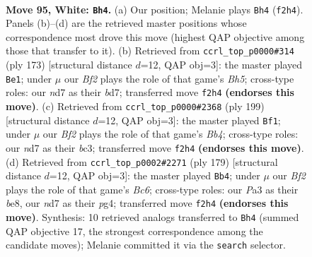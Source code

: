 \documentclass[11pt]{article}
\begin{document}
\clearpage

\begin{figure}[p]\centering
\begin{subfigure}{0.46\textwidth}\centering
\resizebox{\linewidth}{!}{%
\newchessgame
\chessboard[
  setfen={7k/3n4/8/5P2/p2K4/P6P/5B2/8 w - - 9 95},
  showmover=false,
  pgfstyle=straightmove, color=movearrow, markmove={f2-h4}
]}
\caption{}
\end{subfigure}\hfill
\begin{subfigure}{0.46\textwidth}\centering
\resizebox{\linewidth}{!}{%
\newchessgame
\chessboard[
  setfen={8/3B4/5k1p/7P/4K2b/8/8/8 b - - 3 87},
  showmover=false,
  pgfstyle=straightmove, color=movearrow, markmove={h4-e1}
]}
\caption{}
\end{subfigure}
\\[4pt]
\begin{subfigure}{0.46\textwidth}\centering
\resizebox{\linewidth}{!}{%
\newchessgame
\chessboard[
  setfen={4k3/8/p7/1b5p/7P/K1B5/8/8 b - - 29 100},
  showmover=false,
  pgfstyle=straightmove, color=movearrow, markmove={b5-f1}
]}
\caption{}
\end{subfigure}\hfill
\begin{subfigure}{0.46\textwidth}\centering
\resizebox{\linewidth}{!}{%
\newchessgame
\chessboard[
  setfen={4B3/6p1/8/4k1p1/6P1/2b2K2/8/8 b - - 71 90},
  showmover=false,
  pgfstyle=straightmove, color=movearrow, markmove={c3-b4}
]}
\caption{}
\end{subfigure}
\caption{\textbf{Move 95, White: \texttt{Bh4}.} (a) Our position; Melanie plays \texttt{Bh4} (\texttt{f2h4}). Panels (b)--(d) are the retrieved master positions whose correspondence most drove this move (highest QAP objective among those that transfer to it). (b) Retrieved from \texttt{ccrl\_top\_p0000\#314} (ply 173) [structural distance $d$=12, QAP obj=3]: the master played \texttt{Be1}; under $\mu$ our \emph{Bf2} plays the role of that game's \emph{Bh5}; cross-type roles: our \emph{n}d7 as their \emph{b}d7; transferred move \texttt{f2h4} \textbf{(endorses this move)}. (c) Retrieved from \texttt{ccrl\_top\_p0000\#2368} (ply 199) [structural distance $d$=12, QAP obj=3]: the master played \texttt{Bf1}; under $\mu$ our \emph{Bf2} plays the role of that game's \emph{Bb4}; cross-type roles: our \emph{n}d7 as their \emph{b}c3; transferred move \texttt{f2h4} \textbf{(endorses this move)}. (d) Retrieved from \texttt{ccrl\_top\_p0002\#2271} (ply 179) [structural distance $d$=12, QAP obj=3]: the master played \texttt{Bb4}; under $\mu$ our \emph{Bf2} plays the role of that game's \emph{Bc6}; cross-type roles: our \emph{P}a3 as their \emph{b}e8, our \emph{n}d7 as their \emph{p}g4; transferred move \texttt{f2h4} \textbf{(endorses this move)}. Synthesis: 10 retrieved analogs transferred to \texttt{Bh4} (summed QAP objective 17, the strongest correspondence among the candidate moves); Melanie committed it via the \texttt{search} selector.}
\label{fig:thought-m188}
\end{figure}
\end{document}
